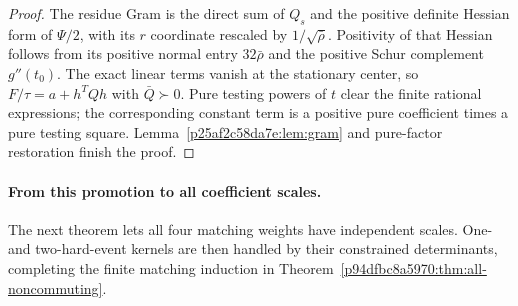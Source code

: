 \begin{proof}
The residue Gram is the direct sum of $Q_s$ and the positive definite Hessian form of $\Psi/2$, with its $r$ coordinate rescaled by $1/\sqrt{\bar\rho}$. Positivity of that Hessian follows from its positive normal entry $32\bar\rho$ and the positive Schur complement $g''(t_0)$. The exact linear terms vanish at the stationary center, so
$F/\tau=a+h^TQh$ with $\bar Q\succ0$. Pure testing powers of $t$ clear the finite rational expressions; the corresponding constant term is a positive pure coefficient times a pure testing square. Lemma~\ref{p25af2c58da7e:lem:gram} and pure-factor restoration finish the proof.
\end{proof}

\paragraph{From this promotion to all coefficient scales.}
The next theorem lets all four matching weights have independent scales. One- and two-hard-event kernels are then handled by their constrained determinants, completing the finite matching induction in Theorem~\ref{p94dfbc8a5970:thm:all-noncommuting}.

